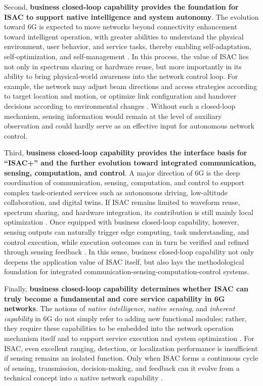 Second, \textbf{business closed-loop capability provides the foundation for ISAC to support native intelligence and system autonomy}. The evolution toward 6G is expected to move networks beyond connectivity enhancement toward intelligent operation, with greater abilities to understand the physical environment, user behavior, and service tasks, thereby enabling self-adaptation, self-optimization, and self-management \cite{Saad2020Vision6G,Strinati20216G}. In this process, the value of ISAC lies not only in spectrum sharing or hardware reuse, but more importantly in its ability to bring physical-world awareness into the network control loop. For example, the network may adjust beam directions and access strategies according to target location and motion, or optimize link configuration and handover decisions according to environmental changes \cite{Liu2022ISAC,Zhang2021ISAC6G}. Without such a closed-loop mechanism, sensing information would remain at the level of auxiliary observation and could hardly serve as an effective input for autonomous network control.

Third, \textbf{business closed-loop capability provides the interface basis for ``ISAC+'' and the further evolution toward integrated communication, sensing, computation, and control}. A major direction of 6G is the deep coordination of communication, sensing, computation, and control to support complex task-oriented services such as autonomous driving, low-altitude collaboration, and digital twins. If ISAC remains limited to waveform reuse, spectrum sharing, and hardware integration, its contribution is still mainly local optimization \cite{Sturm2011WaveformDesign}. Once equipped with business closed-loop capability, however, sensing outputs can naturally trigger edge computing, task understanding, and control execution, while execution outcomes can in turn be verified and refined through sensing feedback \cite{Shi2016EdgeComputing,Chen2024integrated}. In this sense, business closed-loop capability not only deepens the application value of ISAC itself, but also lays the methodological foundation for integrated communication-sensing-computation-control systems.

Finally, \textbf{business closed-loop capability determines whether ISAC can truly become a fundamental and core service capability in 6G networks}. The notions of \emph{native intelligence}, \emph{native sensing}, and \emph{inherent capability} in 6G do not simply refer to adding new functional modules; rather, they require these capabilities to be embedded into the network operation mechanism itself and to support service execution and system optimization \cite{Saad2020Vision6G,Strinati20216G}. For ISAC, even excellent ranging, detection, or localization performance is insufficient if sensing remains an isolated function. Only when ISAC forms a continuous cycle of sensing, transmission, decision-making, and feedback can it evolve from a technical concept into a native network capability \cite{Liu2022ISAC,Kaushik2024toward}.

